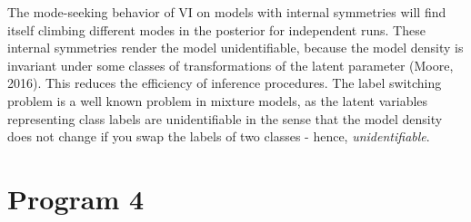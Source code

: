 \documentclass[10pt]{homeworg}
\begin{document}
The mode-seeking behavior of VI on models with internal symmetries will find itself climbing different modes in the posterior for independent runs. These internal symmetries render the model unidentifiable, because the model density is invariant under some classes of transformations of the latent parameter (Moore, 2016). This reduces the efficiency of inference procedures. The label switching problem is a well known problem in mixture models, as the latent variables representing class labels are unidentifiable in the sense that the model density does not change if you swap the labels of two classes - hence, \textit{unidentifiable}.



\section{Program 4}
\end{document}
